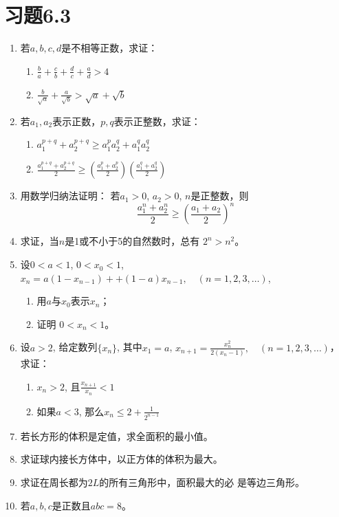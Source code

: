 \section*{习题6.3}

\begin{enumerate}
   \item  若$a,b,c,d$是不相等正数，求证：
\begin{enumerate}
    \item $\frac{b}{a}+\frac{c}{b}+\frac{d}{c}+\frac{a}{d}>4$
    \item $\frac{b}{\sqrt{a}}+\frac{a}{\sqrt{b}}>\sqrt{a}+\sqrt{b}$
\end{enumerate}
   \item  若$a_1,a_2$表示正数，$p,q$表示正整数，求证：
\begin{enumerate}
    \item $a_1^{p+q}+a_2^{p+q}\ge a_1^pa_2^q+a_1^qa_2^q$
    \item $\frac{a_1^{p+q}+a_2^{p+q}}{2}\ge \left(\frac{a_1^p+a_2^p}{2}\right)\left(\frac{a_1^q+a_2^q}{2}\right)$
\end{enumerate}

\item 用数学归纳法证明：
若$a_1>0$, $a_2>0$, $n$是正整数，则
\[\frac{a_1^n+a_2^n}{2}\ge \left(\frac{a_1+a_2}{2}\right)^n\]
\item 求证，当$n$是1或不小于5的自然数时，总有
$2^n>n^2$。
\item 设$0<a<1$, $0<x_0<1$, $x_n=a(1-x_{n-1})+
+(1-a)x_{n-1},\quad (n=1,2,3,\ldots)$,
\begin{enumerate}
    \item 用$a$与$x_0$表示$x_n$；
    \item 证明 $0<x_n<1$。
\end{enumerate}

\item 设$a>2$, 给定数列$\{x_n\}$, 其中$x_1=a$, $x_{n+1}=\frac{x^2_n}{2(x_n-1)},\quad (n=1,2,3,\ldots)$，
求证：
\begin{enumerate}
    \item $x_n>2$, 且$\frac{x_{n+1}}{x_n}<1$
\item 如果$a<3$, 那么$x_n\le 2+\frac{1}{2^{n-1}}$
\end{enumerate}

\item 若长方形的体积是定值，求全面积的最小值。
\item 求证球内接长方体中，以正方体的体积为最大。
\item 求证在周长都为$2L$的所有三角形中，面积最大的必
是等边三角形。
\item 若$a,b,c$是正数且$abc=8$。


\end{enumerate}
